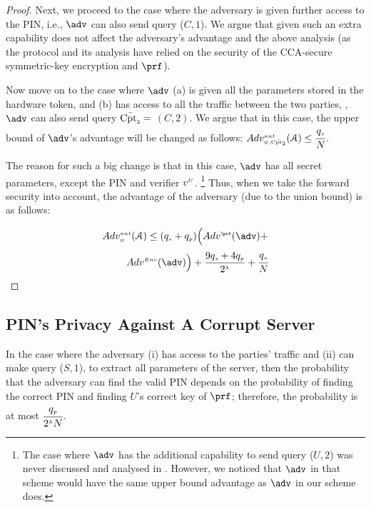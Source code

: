 \begin{proof}
 
Next, we proceed to the case where the adversary is given further access to the PIN, i.e., $\adv$ can also send query  \corrupt($C, 1$). We argue that given such an extra capability does not affect the adversary's advantage and the above analysis (as the protocol and its analysis have relied on the security of the CCA-secure symmetric-key encryption and $\prf$). 

Now move on to the case where $\adv$ (a) is given all the parameters stored in the hardware token, and (b) has access to all the traffic between the two parties, \ie, $\adv$ can also send query  $\bar{\text{Cpt}_{\scriptscriptstyle  2}} =$ \corrupt$(C, 2)$. We argue that in this case, the upper bound of $\adv$'s advantage will be changed as follows:  $Adv_{\scriptscriptstyle\psi, \bar{\text{Cpt}_{\scriptscriptstyle  2}}}^{\scriptscriptstyle  aut}(\mathcal{A})\leq  \cfrac{q_{\scriptscriptstyle  s}}{N}$. 

The reason for such a big change is that in this case, $\adv$ has all secret parameters, except the PIN and verifier ${v}^{\scriptscriptstyle U}$. \footnote{The case where $\adv$ has the additional capability to send query \corrupt($U, 2$) was never discussed and analysed in \cite{BressonCP03}. However, we noticed that $\adv$ in that scheme would have the same upper bound advantage as $\adv$ in our scheme does.} Thus, when we take the forward security into account, the advantage of the adversary (due to the union bound)  is as follows: 

  \begin{equation*}
  \begin{split}
 Adv_{\sss \psi}^{\sss  aut}(\A)  \leq (q_{\sss s} + q_{\sss p})\Big(Adv^{\sss\prf}(\adv)+\\ Adv^{\sss Enc}(\adv)\Big)+\frac{9q_{\sss s}+4q_{\sss  p}}{2^{\sss \lambda}}+  \cfrac{q_{\sss  s}}{N}
 \end{split}
 \end{equation*}

\end{proof}

\subsection{PIN's Privacy Against A Corrupt Server} 

In the case where the adversary (i) has access to the parties' traffic and (ii) can make query \corrupt($S, 1$), to extract all parameters of the server, then the probability that the adversary can find the valid PIN depends on the probability of finding the correct PIN and finding $U$'s correct key of $\prf$; therefore, the probability is at most $\cfrac{q_{\scriptscriptstyle  p}}{2^{\scriptscriptstyle \lambda}N}$. 



